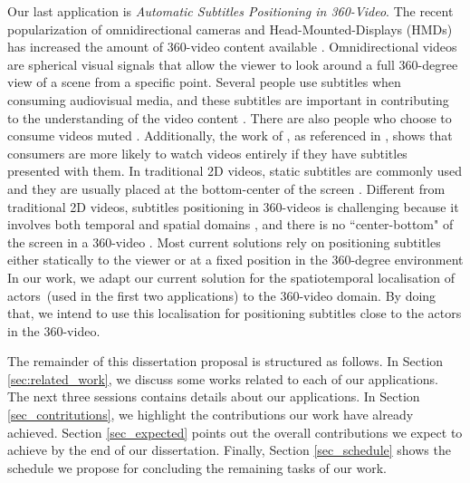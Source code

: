Our last application is \emph{Automatic Subtitles Positioning in 360-Video}. The recent popularization of omnidirectional cameras and Head-Mounted-Displays (HMDs) has increased the amount of 360-video content available \cite{mendes2020authoring}. Omnidirectional videos are spherical visual signals that allow the viewer to look around a full 360-degree view of a scene from a specific point.
Several people use subtitles when consuming audiovisual media, and these subtitles are important in contributing to the understanding of the video content \cite{brown_subtitles_2017}. There are also people who choose to consume videos muted \cite{hughes_disruptive_2019}. Additionally, the work of \cite{hayati2011effect}, as referenced in \cite{hughes_disruptive_2019}, shows that consumers are more likely to watch videos entirely if they have subtitles presented with them. In traditional 2D videos, static subtitles are commonly used and they are usually placed at the bottom-center of the screen \cite{rothe_dynamic_2018}.
Different from traditional 2D videos, subtitles positioning in 360-videos is challenging because it involves both temporal and spatial domains \cite{agullo2019making}, and there is no ``center-bottom" of the screen in a 360-video \cite{brown_subtitles_2017}. Most current solutions rely on positioning subtitles either statically to the viewer or at a fixed position in the 360-degree environment %
In our work, we adapt our current solution for the spatiotemporal localisation of actors~(used in the first two applications) to the 360-video domain. By doing that, we intend to use this localisation for positioning subtitles close to the actors in the 360-video.



The remainder of this dissertation proposal is structured as follows. In Section \ref{sec:related_work}, we discuss some works related to each of our applications. The next three sessions contains details about our applications. In Section \ref{sec_contritutions}, we highlight the contributions our work have already achieved. Section \ref{sec_expected} points out the overall contributions we expect to achieve by the end of our dissertation. Finally, Section \ref{sec_schedule} shows the schedule we propose for concluding the remaining tasks of our work.

